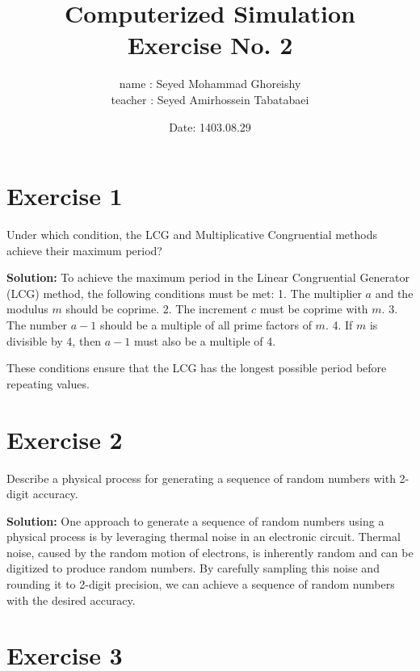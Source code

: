 \documentclass[a4paper,12pt]{article}
\title{Computerized Simulation \\
Exercise No. 2}
\author{name : Seyed Mohammad Ghoreishy \\ teacher : Seyed Amirhossein Tabatabaei }
\date{Date: 1403.08.29}
\begin{document}
\maketitle
\tableofcontents 
\newpage

\section{Exercise 1}
Under which condition, the LCG and Multiplicative Congruential methods achieve their maximum period?

\textbf{Solution:}
To achieve the maximum period in the Linear Congruential Generator (LCG) method, the following conditions must be met:
1. The multiplier \( a \) and the modulus \( m \) should be coprime.
2. The increment \( c \) must be coprime with \( m \).
3. The number \( a - 1 \) should be a multiple of all prime factors of \( m \).
4. If \( m \) is divisible by 4, then \( a - 1 \) must also be a multiple of 4.

These conditions ensure that the LCG has the longest possible period before repeating values.

\newline

\section{Exercise 2}
Describe a physical process for generating a sequence of random numbers with 2-digit accuracy.

\textbf{Solution:}
One approach to generate a sequence of random numbers using a physical process is by leveraging thermal noise in an electronic circuit. Thermal noise, caused by the random motion of electrons, is inherently random and can be digitized to produce random numbers. By carefully sampling this noise and rounding it to 2-digit precision, we can achieve a sequence of random numbers with the desired accuracy.

\newpage

\section{Exercise 3}
\end{document}
